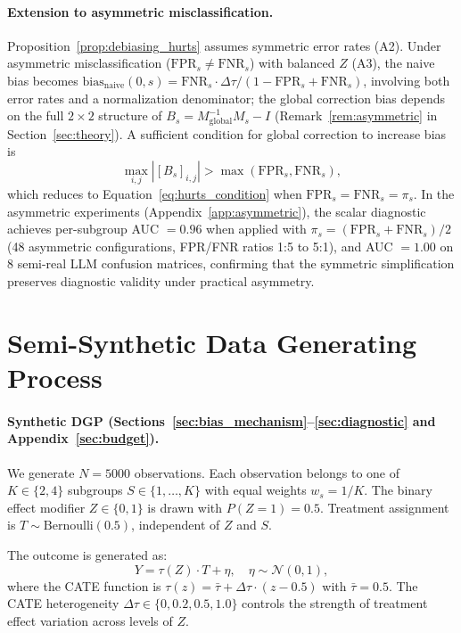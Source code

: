 \paragraph{Extension to asymmetric misclassification.}
Proposition~\ref{prop:debiasing_hurts} assumes symmetric error rates (A2).
Under asymmetric misclassification ($\mathrm{FPR}_s \neq \mathrm{FNR}_s$) with balanced $Z$ (A3), the naive bias becomes $\mathrm{bias}_{\mathrm{naive}}(0,s) = \mathrm{FNR}_s \cdot \Delta\tau / (1 - \mathrm{FPR}_s + \mathrm{FNR}_s)$, involving both error rates and a normalization denominator; the global correction bias depends on the full $2 \times 2$ structure of $B_s = M_{\mathrm{global}}^{-1} M_s - I$ (Remark~\ref{rem:asymmetric} in Section~\ref{sec:theory}).
A sufficient condition for global correction to increase bias is
\begin{equation}
\max_{i,j}|[B_s]_{i,j}| > \max(\mathrm{FPR}_s, \mathrm{FNR}_s),
\end{equation}
which reduces to Equation~\eqref{eq:hurts_condition} when $\mathrm{FPR}_s = \mathrm{FNR}_s = \pi_s$.
In the asymmetric experiments (Appendix~\ref{app:asymmetric}), the scalar diagnostic achieves per-subgroup AUC $= 0.96$ when applied with $\pi_s = (\mathrm{FPR}_s + \mathrm{FNR}_s)/2$ (48 asymmetric configurations, FPR/FNR ratios 1:5 to 5:1), and AUC $= 1.00$ on 8 semi-real LLM confusion matrices, confirming that the symmetric simplification preserves diagnostic validity under practical asymmetry.

\section{Semi-Synthetic Data Generating Process}
\label{app:dgp}

\paragraph{Synthetic DGP (Sections~\ref{sec:bias_mechanism}--\ref{sec:diagnostic} and Appendix~\ref{sec:budget}).}
We generate $N = 5000$ observations.
Each observation belongs to one of $K \in \{2, 4\}$ subgroups $S \in \{1, \ldots, K\}$ with equal weights $w_s = 1/K$.
The binary effect modifier $Z \in \{0, 1\}$ is drawn with $P(Z{=}1) = 0.5$.
Treatment assignment is $T \sim \text{Bernoulli}(0.5)$, independent of $Z$ and $S$.

The outcome is generated as:
\begin{equation}
Y = \tau(Z) \cdot T + \eta, \quad \eta \sim \mathcal{N}(0, 1),
\end{equation}
where the CATE function is $\tau(z) = \bar{\tau} + \Delta\tau \cdot (z - 0.5)$ with $\bar{\tau} = 0.5$.
The CATE heterogeneity $\Delta\tau \in \{0, 0.2, 0.5, 1.0\}$ controls the strength of treatment effect variation across levels of $Z$.

